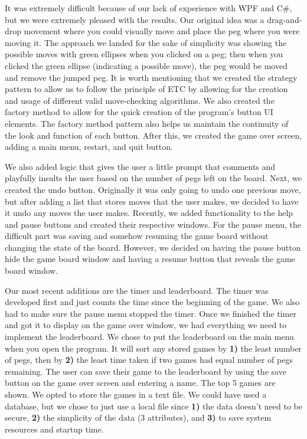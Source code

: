 \documentclass[10pt,conference,onecolumn,compsoc]{IEEEtran}
\begin{document}
It was extremely difficult because of our lack of experience with WPF and C\#, but we were extremely pleased with the results. Our original idea was a drag-and-drop movement where you could visually move and place the peg where you were moving it. The approach we landed for the sake of simplicity was showing the possible moves with green ellipses when you clicked on a peg; then when you clicked the green ellipse (indicating a possible move), the peg would be moved and remove the jumped peg. It is worth mentioning that we created the strategy pattern to allow us to follow the principle of ETC by allowing for the creation and usage of different valid move-checking algorithms. We also created the factory method to allow for the quick creation of the program's button UI elements. The factory method pattern also helps us maintain the continuity of the look and function of each button. After this, we created the game over screen, adding a main menu, restart, and quit button. \newline

We also added logic that gives the user a little prompt that comments and playfully insults the user based on the number of pegs left on the board. Next, we created the undo button. Originally it was only going to undo one previous move, but after adding a list that stores moves that the user makes, we decided to have it undo any moves the user makes. Recently, we added functionality to the help and pause buttons and created their respective windows. For the pause menu, the difficult part was saving and somehow resuming the game board without changing the state of the board. However, we decided on having the pause button hide the game board window and having a resume button that reveals the game board window. \newline

Our most recent additions are the timer and leaderboard. The timer was developed first and just counts the time since the beginning of the game. We also had to make sure the pause menu stopped the timer. Once we finished the timer and got it to display on the game over window, we had everything we need to implement the leaderboard. We chose to put the leaderboard on the main menu when you open the program. It will sort any stored games by \textbf{1)} the least number of pegs, then by \textbf{2)} the least time taken if two games had equal number of pegs remaining. The user can save their game to the leaderboard by using the save button on the game over screen and entering a name. The top 5 games are shown. We opted to store the games in a text file. We could have used a database, but we chose to just use a local file since \textbf{1)} the data doesn't need to be secure, \textbf{2)} the simplicity of the data (3 attributes), and \textbf{3)} to save system resources and startup time.
\end{document}
